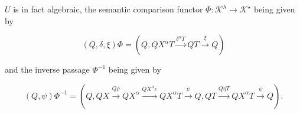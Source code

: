 $U$ is in fact algebraic, the semantic comparison functor $\Phi: \mathcal{K}^{\lambda} \rightarrow \mathcal{K}^{\star}$ being given by

$$(Q, \delta, \xi) \Phi = (Q, QX^{\alpha} T \xrightarrow{\delta^{\alpha} T} QT \xrightarrow{\xi} Q)$$

and the inverse passage $\Phi^{-1}$ being given by

$$(Q, \psi) \Phi^{-1} = (Q, QX \xrightarrow{Q\rho} QX^{\alpha} \xrightarrow{QX^{\alpha} e} QX^{\alpha} T \xrightarrow{\psi} Q, QT \xrightarrow{Q\eta T} QX^{\alpha} T \xrightarrow{\psi} Q).$$
